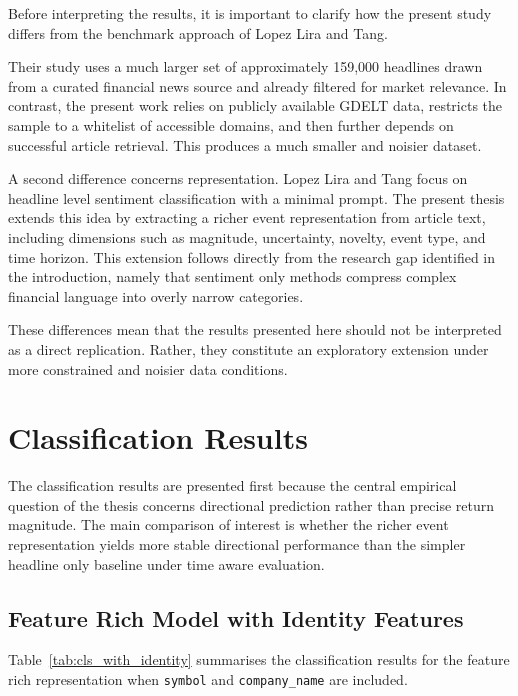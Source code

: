 Before interpreting the results, it is important to clarify how the present study differs from the benchmark approach of Lopez Lira and Tang.

Their study uses a much larger set of approximately 159{,}000 headlines drawn from a curated financial news source and already filtered for market relevance. In contrast, the present work relies on publicly available GDELT data, restricts the sample to a whitelist of accessible domains, and then further depends on successful article retrieval. This produces a much smaller and noisier dataset.

A second difference concerns representation. Lopez Lira and Tang focus on headline level sentiment classification with a minimal prompt. The present thesis extends this idea by extracting a richer event representation from article text, including dimensions such as magnitude, uncertainty, novelty, event type, and time horizon. This extension follows directly from the research gap identified in the introduction, namely that sentiment only methods compress complex financial language into overly narrow categories.

These differences mean that the results presented here should not be interpreted as a direct replication. Rather, they constitute an exploratory extension under more constrained and noisier data conditions.

\section{Classification Results}

The classification results are presented first because the central empirical question of the thesis concerns directional prediction rather than precise return magnitude. The main comparison of interest is whether the richer event representation yields more stable directional performance than the simpler headline only baseline under time aware evaluation.

\subsection{Feature Rich Model with Identity Features}

Table~\ref{tab:cls_with_identity} summarises the classification results for the feature rich representation when \texttt{symbol} and \texttt{company\_name} are included.


